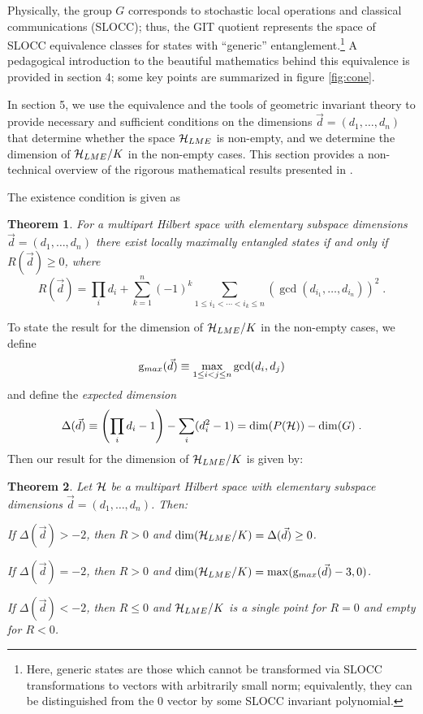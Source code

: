 \documentclass[12pt]{article}
\newtheorem{theorem}{Theorem}[section]
\theoremstyle{definition}
\newcommand{\be}{\begin{equation}}
\newcommand{\ee}{\end{equation}}
\begin{document}
Physically, the group $G$ corresponds to stochastic local operations and classical communications (SLOCC); thus, the GIT quotient represents the space of SLOCC equivalence classes for states with ``generic'' entanglement.\footnote{Here, generic states are those which cannot be transformed via SLOCC transformations to vectors with arbitrarily small norm; equivalently, they can be distinguished from the 0 vector by some SLOCC invariant polynomial.} A pedagogical introduction to the beautiful mathematics behind this equivalence is provided in section 4; some key points are summarized in figure \ref{fig:cone}.

In section 5, we use the equivalence and the tools of geometric invariant theory to provide necessary and sufficient conditions on the dimensions $\vec{d} = (d_1, \dots, d_n)$ that determine whether the space ${\cal H}_{LME}$ is non-empty, and we determine the dimension of ${\cal H}_{LME}/K$ in the non-empty cases. This section provides a non-technical  overview of the rigorous mathematical results presented in \cite{mathpaper}.

The existence condition is given as
\begin{theorem}\label{thm.R}
For a multipart Hilbert space with elementary subspace dimensions $\vec{d} = (d_1, \dots, d_n)$ there exist locally maximally entangled states if and only if $R(\vec{d}) \ge 0$, where
\be
R(\vec{d}) = \prod_i d_i + \sum_{k=1}^n (-1)^k \sum_{1 \le i_1 < \cdots < i_k \le n} (\gcd(d_{i_1},\dots,d_{i_n}))^2 \; .
\ee
\end{theorem}
To state the result for the dimension of ${\cal H}_{LME}/K$ in the non-empty cases,  we define
\be
\label{gmd}
{\rm g}_{max}(\vec{d}) \equiv \max_{1 \le i < j \le n} \gcd(d_i,d_j)
\ee
and define the {\it expected dimension}
\begin{equation} \label{defDelta}
\Delta(\vec{d}) \equiv \left(\prod_i d_i - 1\right) - \sum_i (d_i^2 - 1) = \dim(P({\cal H})) - \dim(G) \; .
\end{equation}
Then our result for the dimension of ${\cal H}_{LME}/K$ is given by:
\begin{theorem}\label{thm.dims}
Let ${\cal H}$ be a multipart Hilbert space with elementary subspace dimensions $\vec{d} = (d_1, \dots, d_n)$. Then:

If $\Delta(\vec{d}) > -2$, then $R > 0$ and $\dim({\cal H}_{LME}/K) = \Delta(\vec{d}) \ge 0$.

If $\Delta(\vec{d}) = -2$, then $R > 0$ and $\dim({\cal H}_{LME}/K)  = \max ({\rm g}_{max}(\vec{d}) -3,0)$.

If $\Delta(\vec{d}) < -2$, then $R \le 0$ and ${\cal H}_{LME}/K$ is a single point for $R=0$ and empty for $R<0$.
\end{theorem}
\end{document}
